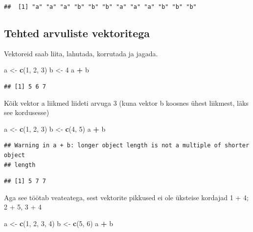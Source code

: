 \documentclass[]{book}
\newenvironment{Shaded}{\begin{snugshade}}{\end{snugshade}}
\newcommand{\KeywordTok}[1]{\textcolor[rgb]{0.13,0.29,0.53}{\textbf{#1}}}
\newcommand{\DecValTok}[1]{\textcolor[rgb]{0.00,0.00,0.81}{#1}}
\newcommand{\StringTok}[1]{\textcolor[rgb]{0.31,0.60,0.02}{#1}}
\newcommand{\OperatorTok}[1]{\textcolor[rgb]{0.81,0.36,0.00}{\textbf{#1}}}
\newcommand{\NormalTok}[1]{#1}
\begin{document}
\begin{verbatim}
##  [1] "a" "a" "a" "b" "b" "b" "a" "a" "a" "b" "b" "b"
\end{verbatim}

\subsection{Tehted arvuliste
vektoritega}\label{tehted-arvuliste-vektoritega}

Vektoreid saab liita, lahutada, korrutada ja jagada.

\begin{Shaded}
\begin{Highlighting}[]
\NormalTok{a <-}\StringTok{ }\KeywordTok{c}\NormalTok{(}\DecValTok{1}\NormalTok{, }\DecValTok{2}\NormalTok{, }\DecValTok{3}\NormalTok{)}
\NormalTok{b <-}\StringTok{ }\DecValTok{4}
\NormalTok{a }\OperatorTok{+}\StringTok{ }\NormalTok{b}
\end{Highlighting}
\end{Shaded}

\begin{verbatim}
## [1] 5 6 7
\end{verbatim}

Kõik vektor a liikmed liideti arvuga 3 (kuna vektor b koosnes ühest
liikmest, läks see kordusesse)

\begin{Shaded}
\begin{Highlighting}[]
\NormalTok{a <-}\StringTok{ }\KeywordTok{c}\NormalTok{(}\DecValTok{1}\NormalTok{, }\DecValTok{2}\NormalTok{, }\DecValTok{3}\NormalTok{)}
\NormalTok{b <-}\StringTok{ }\KeywordTok{c}\NormalTok{(}\DecValTok{4}\NormalTok{, }\DecValTok{5}\NormalTok{) }
\NormalTok{a }\OperatorTok{+}\StringTok{ }\NormalTok{b}
\end{Highlighting}
\end{Shaded}

\begin{verbatim}
## Warning in a + b: longer object length is not a multiple of shorter object
## length
\end{verbatim}

\begin{verbatim}
## [1] 5 7 7
\end{verbatim}

Aga see töötab veateatega, sest vektorite pikkused ei ole üksteise
kordajad 1 + 4; 2 + 5, 3 + 4

\begin{Shaded}
\begin{Highlighting}[]
\NormalTok{a <-}\StringTok{ }\KeywordTok{c}\NormalTok{(}\DecValTok{1}\NormalTok{, }\DecValTok{2}\NormalTok{, }\DecValTok{3}\NormalTok{, }\DecValTok{4}\NormalTok{)}
\NormalTok{b <-}\StringTok{ }\KeywordTok{c}\NormalTok{(}\DecValTok{5}\NormalTok{, }\DecValTok{6}\NormalTok{) }
\NormalTok{a }\OperatorTok{+}\StringTok{ }\NormalTok{b}
\end{Highlighting}
\end{Shaded}
\end{document}
